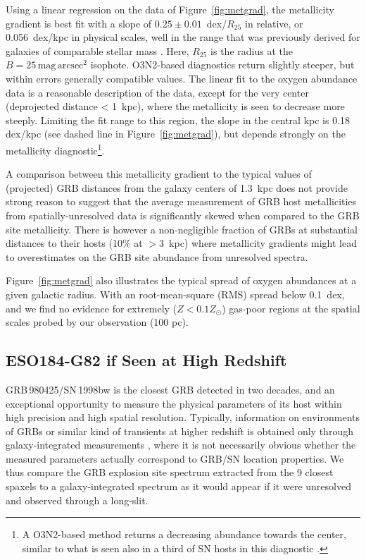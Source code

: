 \documentclass[traditabstract]{aa}
\begin{document}
Using a linear regression on the data of Figure~\ref{fig:metgrad}, the metallicity gradient is best fit with a slope of $0.25\pm0.01$~dex/$R_{25}$ in relative, or 0.056~dex/kpc in physical scales, well in the range that was previously derived for galaxies of comparable stellar mass \citep{2015MNRAS.448.2030H}. Here, $R_{25}$ is the radius at the $B=25\,\mathrm{mag}\,\mathrm{arcsec}^2$ isophote. O3N2-based diagnostics return slightly steeper, but within errors generally compatible values. The linear fit to the oxygen abundance data is a reasonable description of the data, except for the very center (deprojected distance < 1~kpc), where the metallicity is seen to decrease more steeply. Limiting the fit range to this region, the slope in the central kpc is 0.18 dex/kpc (see dashed line in Figure~\ref{fig:metgrad}), but depends strongly on the metallicity diagnostic\footnote{A O3N2-based method returns a decreasing abundance towards the center, similar to what is seen also in a third of SN hosts in this diagnostic \citep{2016A&A...591A..48G}.}.

A comparison between this metallicity gradient to the typical values of (projected) GRB distances from the galaxy centers of 1.3~kpc \citep{2016ApJ...817..144B} does not provide strong reason to suggest that the average measurement of GRB host metallicities from spatially-unresolved data is significantly skewed when compared to the GRB site metallicity. There is however a non-negligible fraction of GRBs at substantial distances to their hosts (10\% at $>3$~kpc) where metallicity gradients might lead to overestimates on the GRB site abundance from unresolved spectra.

Figure~\ref{fig:metgrad} also illustrates the typical spread of oxygen abundances at a given galactic radius. With an root-mean-square (RMS) spread below 0.1~dex, and we find no evidence for extremely ($Z < 0.1 Z_\odot$) gas-poor regions at the spatial scales probed by our observation (100 pc). 

\subsection{ESO184-G82 if Seen at High Redshift}

GRB\,980425/SN\,1998bw is the closest GRB detected in two decades, and an exceptional opportunity to measure the physical parameters of its host within high precision and high spatial resolution. Typically, information on environments of GRBs or similar kind of transients  at higher redshift is obtained only through galaxy-integrated measurements \citep{2015A&A...581A.125K, 2016A&A...590A.129J}, where it is not necessarily obvious whether the measured parameters actually correspond to GRB/SN location properties. We thus compare the GRB explosion site spectrum extracted from the 9 closest spaxels to a galaxy-integrated spectrum as it would appear if it were unresolved and observed through a long-slit. 
\end{document}
